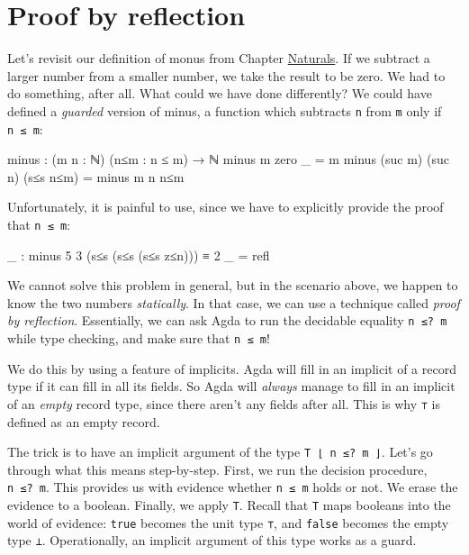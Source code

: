 \hypertarget{Decidable-proof-by-reflection}{%
\section{Proof by reflection}\label{Decidable-proof-by-reflection}}

Let's revisit our definition of monus from Chapter
\protect\hyperlink{Naturals}{Naturals}. If we subtract a larger number
from a smaller number, we take the result to be zero. We had to do
something, after all. What could we have done differently? We could have
defined a \emph{guarded} version of minus, a function which subtracts
\texttt{n} from \texttt{m} only if \texttt{n\ ≤\ m}:

\begin{fence}
\begin{code}
minus : (m n : ℕ) (n≤m : n ≤ m) → ℕ
minus m       zero    _         = m
minus (suc m) (suc n) (s≤s n≤m) = minus m n n≤m
\end{code}
\end{fence}

Unfortunately, it is painful to use, since we have to explicitly provide
the proof that \texttt{n\ ≤\ m}:

\begin{fence}
\begin{code}
_ : minus 5 3 (s≤s (s≤s (s≤s z≤n))) ≡ 2
_ = refl
\end{code}
\end{fence}

We cannot solve this problem in general, but in the scenario above, we
happen to know the two numbers \emph{statically}. In that case, we can
use a technique called \emph{proof by reflection}. Essentially, we can
ask Agda to run the decidable equality \texttt{n\ ≤?\ m} while type
checking, and make sure that \texttt{n\ ≤\ m}!

We do this by using a feature of implicits. Agda will fill in an
implicit of a record type if it can fill in all its fields. So Agda will
\emph{always} manage to fill in an implicit of an \emph{empty} record
type, since there aren't any fields after all. This is why \texttt{⊤} is
defined as an empty record.

The trick is to have an implicit argument of the type
\texttt{T\ ⌊\ n\ ≤?\ m\ ⌋}. Let's go through what this means
step-by-step. First, we run the decision procedure, \texttt{n\ ≤?\ m}.
This provides us with evidence whether \texttt{n\ ≤\ m} holds or not. We
erase the evidence to a boolean. Finally, we apply \texttt{T}. Recall
that \texttt{T} maps booleans into the world of evidence: \texttt{true}
becomes the unit type \texttt{⊤}, and \texttt{false} becomes the empty
type \texttt{⊥}. Operationally, an implicit argument of this type works
as a guard.

